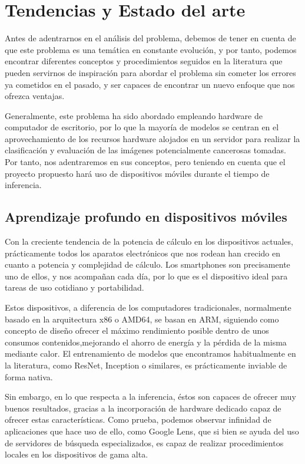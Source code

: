 \chapter{Tendencias y Estado del arte}

Antes de adentrarnos en el análisis del problema, debemos de tener en cuenta de que este problema es una temática en constante evolución, y por tanto, podemos encontrar diferentes conceptos y procedimientos seguidos en la literatura que pueden servirnos de inspiración para abordar el problema sin cometer los errores ya cometidos en el pasado, y ser capaces de encontrar un nuevo enfoque que nos ofrezca ventajas.

Generalmente, este problema ha sido abordado empleando hardware de computador de escritorio, por lo que la mayoría de modelos se centran en el aprovechamiento de los recursos hardware alojados en un servidor para realizar la clasificación y evaluación de las imágenes potencialmente cancerosas tomadas. Por tanto, nos adentraremos en sus conceptos, pero teniendo en cuenta que el proyecto propuesto hará uso de dispositivos móviles durante el tiempo de inferencia.

\section{Aprendizaje profundo en dispositivos móviles}

Con la creciente tendencia de la potencia de cálculo en los dispositivos actuales, prácticamente todos los aparatos electrónicos que nos rodean han crecido en cuanto a potencia y complejidad de cálculo. Los smartphones son precisamente uno de ellos, y nos acompañan cada día, por lo que es el dispositivo ideal para tareas de uso cotidiano y portabilidad.

Estos dispositivos, a diferencia de los computadores tradicionales, normalmente basado en la arquitectura x86 o AMD64, se basan en ARM, siguiendo como concepto de diseño ofrecer el máximo rendimiento posible dentro de unos consumos contenidos,mejorando el ahorro de energía y la pérdida de la misma mediante calor. El entrenamiento de modelos que encontramos habitualmente en la literatura, como ResNet, Inception o similares, es prácticamente inviable de forma nativa.

Sin embargo, en lo que respecta a la inferencia, éstos son capaces de ofrecer muy buenos resultados, gracias a la incorporación de hardware dedicado capaz de ofrecer estas características. Como prueba, podemos observar infinidad de aplicaciones que hace uso de ello, como Google Lens, que si bien se ayuda del uso de servidores de búsqueda especializados, es capaz de realizar procedimientos locales en los dispositivos de gama alta. 

